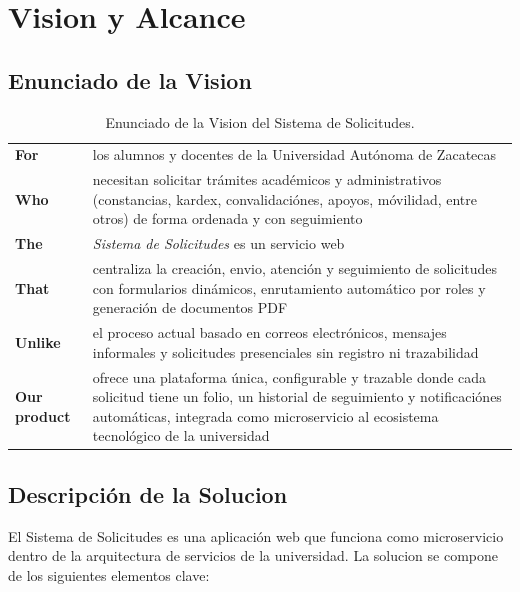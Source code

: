 \chapter{Vision y Alcance}

\section{Enunciado de la Vision}

\begin{table}[H]
\centering
\renewcommand{\arraystretch}{1.5}
\begin{tabular}{|l p{10cm}|}
    \hline
    \textbf{For} & los alumnos y docentes de la Universidad Autónoma de Zacatecas \\
    \textbf{Who} & necesitan solicitar trámites académicos y administrativos (constancias, kardex, convalidaciónes, apoyos, móvilidad, entre otros) de forma ordenada y con seguimiento \\
    \textbf{The} & \textit{Sistema de Solicitudes} es un servicio web \\
    \textbf{That} & centraliza la creación, envio, atención y seguimiento de solicitudes con formularios dinámicos, enrutamiento automático por roles y generación de documentos PDF \\
    \textbf{Unlike} & el proceso actual basado en correos electrónicos, mensajes informales y solicitudes presenciales sin registro ni trazabilidad \\
    \textbf{Our product} & ofrece una plataforma única, configurable y trazable donde cada solicitud tiene un folio, un historial de seguimiento y notificaciónes automáticas, integrada como microservicio al ecosistema tecnológico de la universidad \\
    \hline
\end{tabular}
\caption{Enunciado de la Vision del Sistema de Solicitudes.}
\label{tab:vision}
\end{table}

\section{Descripción de la Solucion}

El Sistema de Solicitudes es una aplicación web que funciona como microservicio dentro de la arquitectura de servicios de la universidad. La solucion se compone de los siguientes elementos clave:

